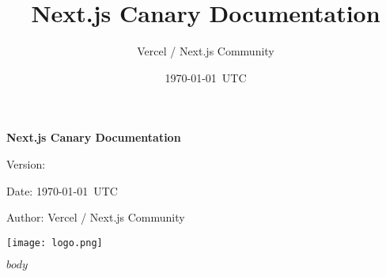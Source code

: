 \documentclass[11pt]{article}
\title{\textbf{Next.js Canary Documentation}}
\author{Vercel / Next.js Community}
\date{\today\ UTC}
\begin{document}
\begin{titlepage}
  \centering
  {\Huge \textbf{Next.js Canary Documentation} \par}
  \vspace{1.5cm}
  {\Large Version: \texttt{\version} \par}
  {\large Date: \today\ UTC \par}
  {\large Author: Vercel / Next.js Community \par}
  \vfill
  \texttt{[image: logo.png]} %
\end{titlepage}

\tableofcontents
\newpage

$body$

\end{document}
